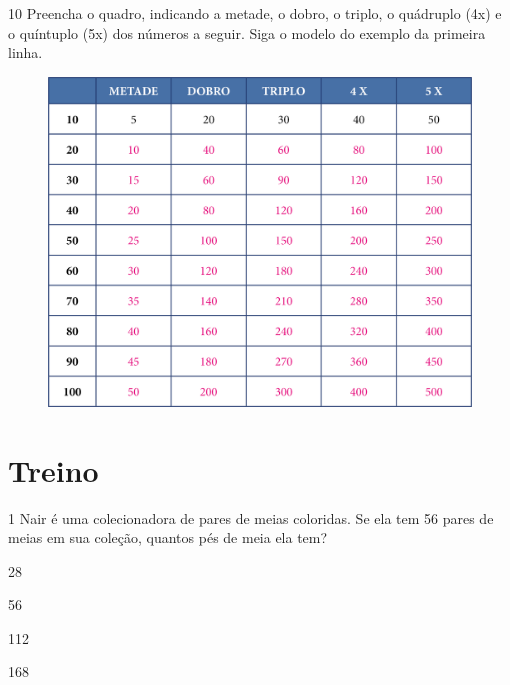 \pagebreak
\num{10} Preencha o quadro, indicando a metade, o dobro, o triplo, o quádruplo
(4x) e o quíntuplo (5x) dos números a seguir. Siga o modelo do exemplo da
primeira linha.

\begin{figure}[htpb!]
\includegraphics[width=\textwidth]{./media/image111.png}
\end{figure}


\pagebreak
\section*{Treino}

\num{1} Nair é uma colecionadora de pares de meias coloridas. Se
ela tem 56 pares de meias em sua coleção, quantos pés de meia ela tem?

\begin{escolha}[itemsep=-5pt]
\item 28

\item 56

\item 112

\item 168
\end{escolha}

